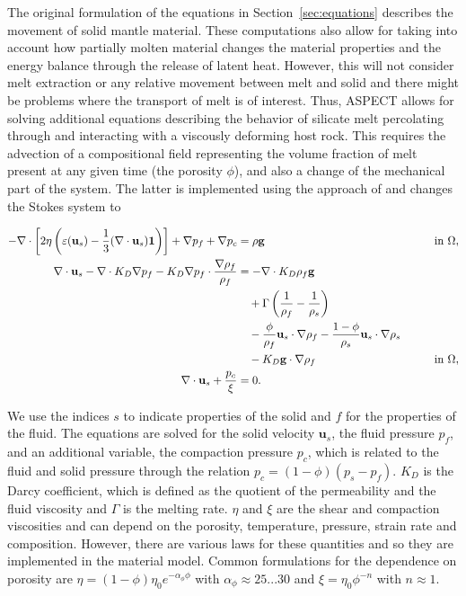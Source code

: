 \documentclass{article}
\newcommand{\aspect}{\textsc{ASPECT}}
\begin{document}
The original formulation of the equations in Section~\ref{sec:equations} describes the movement of solid mantle material. These computations also allow for taking into account how partially molten material changes the material properties and the energy balance through the release of latent heat. However, this will not consider melt extraction or any relative movement between melt and solid and there might be problems where the transport of melt is of interest. Thus, \aspect{} allows for solving additional equations describing the behavior of silicate melt percolating through and interacting with a viscously deforming host rock. This requires 
the advection of a compositional field representing the volume fraction of melt present at any given time (the porosity $\phi$), 
and also a change of the mechanical part of the system. The latter is implemented using the approach of \cite{KMK2013} and changes 
the Stokes system to

\begin{align}
  \label{eq:stokes-1-melt}
  -\nabla \cdot \left[2\eta \left(\varepsilon(\mathbf{u}_s)
                                  - \frac{1}{3}(\nabla \cdot \mathbf{u}_s)\mathbf 1\right)
                \right] + \nabla p_f + \nabla p_c  &=
  \rho \mathbf g
  & \qquad
  & \textrm{in $\Omega$},
  \\
  \label{eq:stokes-2-melt}
  \nabla \cdot \mathbf{u}_s - \nabla \cdot K_D \nabla p_f 
  - K_D \nabla p_f \cdot \frac{\nabla \rho_f}{\rho_f}
  &= 
  - \nabla \cdot K_D \rho_f \mathbf g
  \notag
  \\
  &\quad
  + \Gamma \left( \frac{1}{\rho_f} - \frac{1}{\rho_s} \right)
  \\
  &\quad
  - \frac{\phi }{\rho_f} \mathbf{u}_s \cdot \nabla\rho_f 
  - \frac{1 - \phi }{\rho_s} \mathbf{u}_s \cdot \nabla\rho_s
  \notag
  \\
  &\quad
  - K_D \mathbf g \cdot \nabla \rho_f 
  & \qquad
  & \textrm{in $\Omega$},
  \notag
  \\
  \label{eq:stokes-3-melt}
  \nabla \cdot \mathbf{u}_s + \frac{p_c}{\xi} 
  &=
  0.
\end{align}

We use the indices $s$ to indicate properties of the solid and $f$ for the properties of the fluid. 
The equations are solved for the solid velocity $\mathbf{u}_s$, the fluid pressure $p_f$, and an additional 
variable, the compaction pressure $p_c$, which is related to the fluid and solid pressure through the relation 
$p_c = (1-\phi) (p_s-p_f)$. $K_D$ is the Darcy coefficient, which is defined as the quotient of the permeability 
and the fluid viscosity and $\Gamma$ is the melting rate. $\eta$ and $\xi$ are the shear and compaction viscosities 
and can depend on the porosity, temperature, pressure, strain rate and composition. However, there are various 
laws for these quantities and so they are implemented in the material model. Common formulations for the dependence 
on porosity are $\eta = (1-\phi) \eta_0 e^{-\alpha_\phi \phi}$ with $\alpha_\phi \approx 25...30$ and 
$\xi = \eta_0 \phi^{-n}$ with $n \approx 1$.
\end{document}

